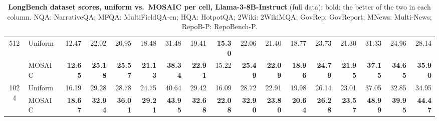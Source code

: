 \begin{table}[tp]
\begin{tabular}{@{} c l rrrr rrrr rrrr rrr @{}}
    \cmidrule(l){1-17}
    \multirow{2}{*}{512} & Uniform & 12.47 & 22.02 & 20.95 & 18.48 & 31.48 & 19.41 & \textbf{15.30} & 22.06 & 21.40 & 18.77 & 23.73 & 21.30 & 31.33 & 24.96 & 28.14 \\
     & MOSAIC & \textbf{12.65} & \textbf{25.18} & \textbf{25.57} & \textbf{21.13} & \textbf{38.34} & \textbf{22.91} & 15.22 & \textbf{25.49} & \textbf{22.09} & \textbf{18.96} & \textbf{24.79} & \textbf{21.95} & \textbf{37.15} & \textbf{34.65} & \textbf{35.90} \\
    \cmidrule(l){1-17}
    \multirow{2}{*}{1024} & Uniform & 16.19 & 29.28 & 28.78 & 24.75 & 40.64 & 29.42 & 16.09 & 28.72 & 22.91 & 19.98 & 26.14 & 23.01 & 37.05 & 32.85 & 34.95 \\
     & MOSAIC & \textbf{18.67} & \textbf{32.94} & \textbf{36.01} & \textbf{29.21} & \textbf{43.95} & \textbf{32.68} & \textbf{22.08} & \textbf{32.90} & \textbf{23.80} & \textbf{20.64} & \textbf{26.28} & \textbf{23.57} & \textbf{48.99} & \textbf{39.95} & \textbf{44.47} \\
    \bottomrule
  \end{tabular}
  \caption{\textbf{LongBench dataset scores, uniform vs.\ MOSAIC per cell, Llama-3-8B-Instruct} (full data); bold: the better of the two in each column. NQA: NarrativeQA; MFQA: MultiFieldQA-en; HQA: HotpotQA; 2Wiki: 2WikiMQA; GovRep: GovReport; MNews: Multi-News; RepoB-P: RepoBench-P.}
  \label{tab:app-lb}
\end{table}

